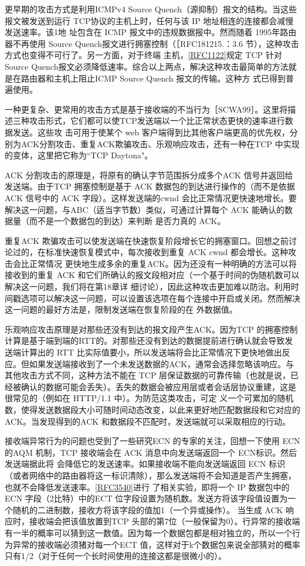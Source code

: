 更早期的攻击方式是利用ICMPv4 Source Quench（源抑制）报文的结构。当这些报文被发送到运行 TCP协议的主机上时，任何与该 IP 地址相连的连接都会减慢发送速率。该1地
址包含在 ICMP 报文中的违规数据报中。然而随着 1995年路由器不再使用 Source Quench报文进行拥塞控制（［RFC181215.：3.6 节），这种攻击方式也变得不可行了。另一方面，对于终端
主机，\href{https://www.rfc-editor.org/rfc/rfc1122}{[RFC1122]}规定 TCP 针对 Source Quench报文必须降低速率。综合以上两点，解决这种攻击最简单的方法就是在路由器和主机上阻止ICMP Source Quench 报文的传输。这种方
式已得到普遍使用。

一种更复杂、更常用的攻击方式是基于接收端的不当行为［SCWA99］。这里将描述三种攻击形式，它们都可以使TCP发送端以一个比正常状态更快的速率进行数据发送。这些攻
击可用于使某个 web 客户端得到比其他客户端更高的优先权，分别为ACK分割攻击、重复ACK欺骗攻击、乐观响应攻击，还有一种在TCP 中实现的变体，这里把它称为“TCP
Daytona"。

ACK 分割攻击的原理是，将原有的确认字节范围拆分成多个ACK 信号并返回给发送端。由于TCP 拥塞控制是基于 ACK 数据包的到达进行操作的（而不是依据ACK 信号中的
ACK 字段）。这样发送端的cwnd 会比正常情况更快速地增长。要解决这一问题，与ABC（适当字节数）类似，可通过计算每个 ACK 能确认的数据量（而不是一个数据包的到达）来判断
是否力真的 ACK。

重复ACK 欺骗攻击可以使发送端在快速恢复阶段增长它的拥塞窗口。回想之前讨论过的，在标准快速恢复模式中，每次接收到重复 ACK cwnd 都会增长。这种攻击会比正常情况
更快地生成多余的重复ACK。因为还没有一种明确的方法可以将接收到的重复 ACK 和它们所确认的报文段相对应（一个基于时间的伪随机数可以解决这一问题，我们将在第18章详
细讨论），因此这种攻击更加难以防治。利用时间戳选项可以解决这一问题，可以设置该选项在每个连接中开启或关闭。然而解决这一问题的最好方法是，限制发送端在恢复阶段的在
外数据值。

乐观响应攻击原理是对那些还没有到达的报文段产生ACK。因为TCP 的拥塞控制计算是基于端到端的RTT的。对那些还没有到达的数据提前进行确认就会导致发送端计算出的
RTT 比实际值要小，所以发送端将会比正常情况下更快地做出反应。但如果发送端接收到了一个未发送数据的ACK，通常会选择忽略该响应。与其他攻击方式不同，这种方法不能在
TCP 层保证数据的可靠传输（也就是说，已经被确认的数据可能会丢失）。丢失的数据会被应用层或者会话层协议重建，这是很常见的（例如在 HTTP/1.1 中）。为防范这类攻击，可定
义一个可累加的随机数，使得发送数据段大小可随时间动态改变，以此来更好地匹配数据段和它对应的ACK。当发现得到的ACK 和数据段不匹配时，发送端就可以采取相应的行动。

接收端异常行为的问题也受到了一些研究ECN 的专家的关注，回想一下使用 ECN的AQM 机制，TCP 接收端会在 ACK 消息中向发送端返回一个 ECN标识。然后发送端据此将
会降低它的发送速率。如果接收端不能向发送端返回 ECN 标识（或者网络中的路由器将这一标识清除），那么发送端将不会知道是否产生拥塞，也就不会降低发送速率。\href{https://www.rfc-editor.org/rfc/rfc3540}{[RFC3540]}进行
了相关实验，即将一个 IP 数据包中的ECN 字段（2比特）中的ECT 位字段设置为随机数。发送方将该字段值设置为一个随机的二进制数，接收方将该字段的值加1（一个异或操作）。
当生成 ACK 响应时，接收端会把该值放置到TCP 头部的第7位（一般保留为0）。行异常的接收端有一半的概率可以猜到这一数值。因为每一个数据包都是相对独立的，所以一个行
为异常的接收端必须猪对每一个ECT 值，这样对于k个数据包来说全部猜对的概率只有1/2（对于任何一个长时间使用的连接这都是很微小的）。

